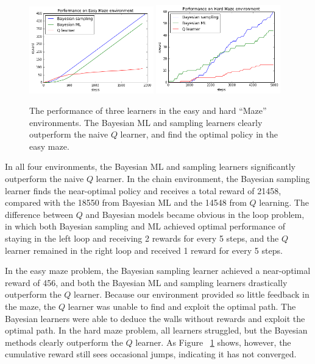 \documentclass[10pt, twocolumn, twoside]{article}
\begin{document}
\begin{figure}[!htb]
\centering
\includegraphics[width=0.48\textwidth]{smallMazePerf.png}
\includegraphics[width=0.48\textwidth]{largeMazePerf.png}
\caption{\label{fig:easyhardPerf} The performance of three learners in the easy and hard ``Maze''
environments. The Bayesian ML and sampling learners clearly outperform the naive $Q$ learner, and
find the optimal policy in the easy maze.}
\end{figure}

In all four environments, the Bayesian ML and sampling learners significantly outperform the naive
$Q$ learner. In the chain environment, the Bayesian sampling learner finds the near-optimal policy and
receives a total reward of 21458, compared with the 18550 from Bayesian ML and the 14548 from $Q$ learning.
The difference between $Q$ and Bayesian models became obvious in the loop problem, in which both Bayesian
sampling and ML achieved optimal performance of staying in the left loop and receiving 2 rewards for every
5 steps, and the $Q$ learner remained in the right loop and received 1 reward for every 5 steps.

In the easy maze problem, the Bayesian sampling learner achieved a near-optimal reward of 456, and both the
Bayesian ML and sampling learners drastically outperform the $Q$ learner. Because our environment provided
so little feedback in the maze, the $Q$ learner was unable to find and exploit the optimal path. The Bayesian
learners were able to deduce the walls without rewards and exploit the optimal path. In the hard maze problem,
all learners struggled, but the Bayesian methods clearly outperform the $Q$ learner. As Figure ~\ref{fig:easyhardPerf}
shows, however, the cumulative reward still sees occasional jumps, indicating it has not converged.
\end{document}
